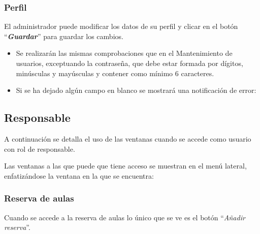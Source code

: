 
\subsubsection{Perfil}
El administrador puede modificar los datos de su perfil y clicar en el botón ``\textbf{\textit{Guardar}}'' para guardar los cambios. 

\begin{itemize}
    \item Se realizarán las mismas comprobaciones que en el Mantenimiento de usuarios, exceptuando la contraseña, que debe estar formada por dígitos, minúsculas y mayúsculas y contener como mínimo 6 caracteres.
    
    
    \item Si se ha dejado algún campo en blanco se mostrará una notificación de error:
    
\end{itemize}


\subsection{Responsable}
A continuación se detalla el uso de las ventanas cuando se accede como usuario con rol de responsable.

Las ventanas a las que puede que tiene acceso se muestran en el menú lateral, enfatizándose la ventana en la que se encuentra:


\subsubsection{Reserva de aulas}
Cuando se accede a la reserva de aulas lo único que se ve es el botón ``\textit{Añadir reserva}''.



